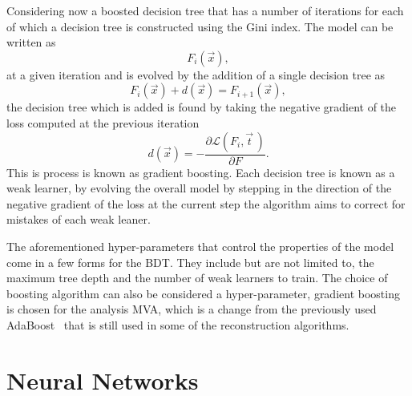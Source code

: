 Considering now a boosted decision tree that has a number of iterations for each
of which a decision tree is constructed using the Gini index. The model can be
written as
\begin{equation}
  F_i(\vec{x}),
\end{equation}
at a given iteration and is evolved by the addition of a single decision tree as
\begin{equation}
  F_i({\vec{x}}) + d(\vec{x}) = F_{i+1}(\vec{x}),
\end{equation}
the decision tree which is added is found by taking the negative gradient of the
loss computed at the previous iteration
\begin{equation}
  d(\vec{x}) = - \frac{\partial \mathcal{L}(F_i, \vec{t} \,)}{\partial F}.
\end{equation}
This is process is known as gradient boosting. Each decision tree is known as a
weak learner, by evolving the overall model by stepping in the direction of the
negative gradient of the loss at the current step the algorithm aims to correct
for mistakes of each weak leaner.

The aforementioned hyper-parameters that control the properties of the model
come in a few forms for the BDT. They include but are not limited to, the
maximum tree depth and the number of weak learners to train. The choice of
boosting algorithm can also be considered a hyper-parameter, gradient boosting
is chosen for the analysis MVA, which is a change from the previously used
AdaBoost~\cite{AdaBoost} that is still used in some of the reconstruction
algorithms.

\section{Neural Networks}%

\label{sec:neural-networks}

